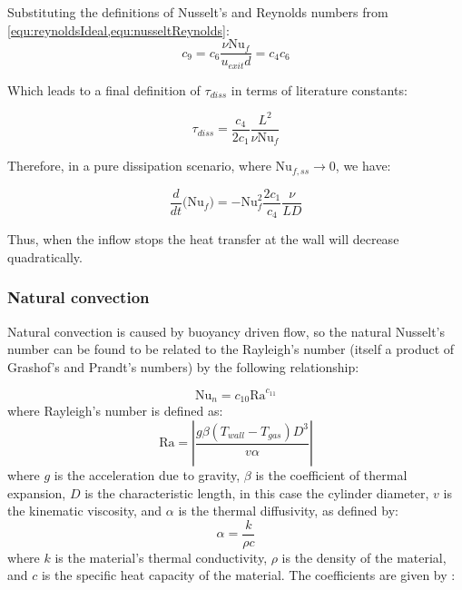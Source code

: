 \noindent  Substituting the definitions of Nusselt's and Reynolds numbers from \cref{equ:reynoldsIdeal,equ:nusseltReynolds}:
\begin{equation}
c_9 = c_6 \frac{\nu\text{Nu}_f}{u_{exit}d} = c_4 c_6
\end{equation}

\noindent Which leads to a final definition of $\tau_{diss}$ in terms of literature constants:

\begin{equation}
\tau_{diss} = \frac{c_4}{2c_1}  \frac{L^2}{\nu \text{Nu}_f}
\end{equation}

\noindent Therefore, in a pure dissipation scenario, where $\text{Nu}_{f,ss} \rightarrow 0$, we have:

\begin{equation}
\frac{d}{dt}\Big(\text{Nu}_f \Big) = -\text{Nu}_f^2  \frac{2c_1}{c_4}\frac{\nu}{LD}
\end{equation}

\noindent Thus, when the inflow stops the heat transfer at the wall will decrease quadratically.

\subsubsection{Natural convection}
\label{sec:naturalConvection}

Natural convection is caused by buoyancy driven flow, so the natural Nusselt's number can be found to be related to the Rayleigh's number (itself a product of Grashof's and Prandt's numbers) by the following relationship:

\begin{equation}
\text{Nu}_n  = c_{10} \text{Ra}^{c_{11}}
\end{equation}
where Rayleigh's number is defined as:
\begin{equation}
\text{Ra} = \left| \frac{g\beta\left(T_{wall} - T_{gas} \right) D^3}{v\alpha}\right|
\end{equation}
where $g$ is the acceleration due to gravity, $\beta$ is the coefficient of thermal expansion, $D$ is the characteristic length, in this case the cylinder diameter, $v$ is the kinematic viscosity, and $\alpha$ is the thermal diffusivity, as defined by:
\begin{equation}
\label{equ:thermalDiffusivity}
\alpha = \frac{k}{\rho c}
\end{equation}
where $k$ is the material's thermal conductivity, $\rho$ is the density of the material, and $c$ is the specific heat capacity of the material. The coefficients are given by :

